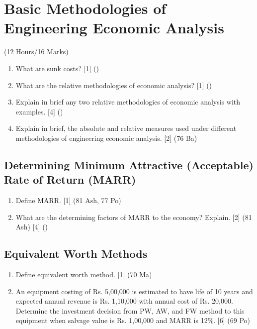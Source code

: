 \documentclass[12pt]{article}
\begin{document}
\section{Basic Methodologies of Engineering Economic Analysis}
	\begin{center}(12 Hours/16 Marks)\end{center}
	\begin{enumerate}[noitemsep, topsep = 0pt]
		\item What are sunk costs? \hfill [1] ()
		
		\item What are the relative methodologies of economic analysis? \hfill [1] ()
		
		\item Explain in brief any two relative methodologies of economic analysis with examples. \hfill [4] ()
		
		\item Explain in brief, the absolute and relative measures used under different methodologies of engineering economic analysis. \hspace{10.4cm} [2] (76 Ba)
	\end{enumerate}
	
	\subsection{Determining Minimum Attractive (Acceptable) Rate of Return (MARR)}
		\begin{enumerate}[noitemsep, topsep = 0pt]
			\item Define MARR. \hfill [1] (81 Ash, 77 Po)
			
			\item What are the determining factors of MARR to the economy? Explain. \hfill [2] (81 Ash) [4] ()
		\end{enumerate}

	\subsection{Equivalent Worth Methods}
		\begin{enumerate}[noitemsep, topsep=0pt]
			\item Define equivalent worth method. \hfill [1] (70 Ma)

			\item An equipment costing of Rs. 5,00,000 is estimated to have life of 10 years and expected annual revenue is Rs. 1,10,000 with annual cost of Rs. 20,000. Determine the investment decision from PW, AW, and FW method to this equipment when salvage value is Rs. 1,00,000 and MARR is 12\%. \hfill [6] (69 Po)
		\end{enumerate}
\end{document}

